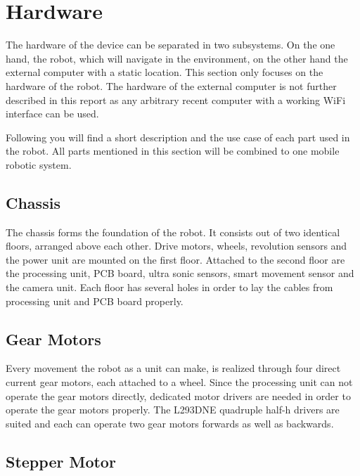 \newpage

\section{Hardware}\label{sec:hardware}

The hardware of the device can be separated in two subsystems. On the one hand, the robot, which will navigate in the environment, on the other hand the external computer with a static location. This section only focuses on the hardware of the robot. The hardware of the external computer is not further described in this report as any arbitrary recent computer with a working WiFi interface can be used.

Following you will find a short description and the use case of each part used in the robot. All parts mentioned in this section will be combined to one mobile robotic system.

\subsection{Chassis}\label{subsec:chassis}

The chassis forms the foundation of the robot. It consists out of two identical floors, arranged above each other. Drive motors, wheels, revolution sensors and the power unit are mounted on the first floor. Attached to the second floor are the processing unit, PCB board, ultra sonic sensors, smart movement sensor and the camera unit. Each floor has several holes in order to lay the cables from processing unit and PCB board properly.

\subsection{Gear Motors}\label{subsec:gear_motors}

Every movement the robot as a unit can make, is realized through four direct current gear motors, each attached to a wheel. Since the processing unit can not operate the gear motors directly, dedicated motor drivers are needed in order to operate the gear motors properly. The L293DNE quadruple half-h drivers \cite{l293dne} are suited and each can operate two gear motors forwards as well as backwards. 

\subsection{Stepper Motor}\label{subsec:stepper_motor}

